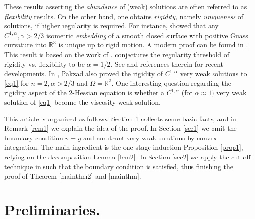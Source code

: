 \documentclass[reqno,12pt]{amsart}
\numberwithin{equation}{section}
\theoremstyle{plain}
\theoremstyle{definition}
\newcommand{\R}{\mathbb{R}}
\begin{document}
These results asserting the \emph{abundance} of (weak) solutions are often referred to as \emph{flexibility} results. On the other hand, one obtains \emph{rigidity}, namely \emph{uniqueness} of solutions, if higher regularity is required. For instance, \citet{borisov1959parallel} showed that any $C^{1,\alpha},\alpha>2/3$ isometric \emph{embedding} of a smooth closed surface with positive Guass curvature into $\R^3$ is unique up to rigid motion.  A modern proof can be found in \cite{conti12hprinciple,conti12errata}. This result is based on the work of \citet{pogorelov1959rigidity,pogorelov1973extrinsic}. \citet[Section 3.5.5.C, Open Problem 34-36]{gromov17geometric} conjectures the regularity threshold of rigidity vs. flexibility to be $\alpha=1/2$. See \cite{delellis2021geometry,pakzad2022convexity} and references therein for recent developments. In \cite{pakzad2022convexity}, Pakzad also proved the rigidity of $C^{1,\alpha}$ very weak solutions to \eqref{eq1} for $n=2,\alpha>2/3$ and $\Omega=\R^2$. One interesting question regarding the rigidity aspect of the 2-Hessian equation is whether a $C^{1,\alpha}$ (for $\alpha \approx 1$) very weak solution of \eqref{eq1} become the viscosity weak solution.



This article is organized as follows. Section \ref{sec0} collects some basic facts, and in Remark \ref{rem1} we explain the idea of the proof. In Section \ref{sec1} we omit the boundary condition $v=g$ and construct very weak solutions by convex integration. The main ingredient is the one stage induction Proposition \ref{prop1}, relying on the decomposition Lemma \ref{lem2}. In Section \ref{sec2} we apply the cut-off technique in \cite{cao23dirichlet} such that the boundary condition is satisfied, thus finishing the proof of Theorem \ref{mainthm2} and \ref{mainthm}.

\section{Preliminaries.}\label{sec0}
\end{document}

